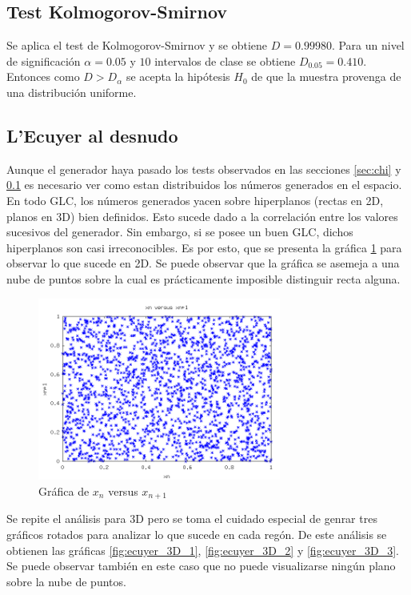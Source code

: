 \documentclass{sig-alternate}
\begin{document}
\subsection{Test Kolmogorov-Smirnov}
\label{sec:kolmogorov}
Se aplica el test de Kolmogorov-Smirnov y se obtiene $D=0.99980$.
Para un nivel de significaci\'on $\alpha=0.05$ y $10$ intervalos de clase
se obtiene $D_{0.05}=0.410$. Entonces como $D > D_{\alpha}$
se acepta la hip\'otesis $H_{0}$ de que la muestra
provenga de una distribuci\'on uniforme.

\subsection{L'Ecuyer al desnudo}
Aunque el generador haya pasado los tests observados en las secciones \ref{sec:chi} y \ref{sec:kolmogorov}
es necesario ver como estan distribuidos los n\'umeros generados en el espacio. En todo GLC,
los n\'umeros generados yacen sobre hiperplanos (rectas en 2D, planos en 3D) bien definidos. Esto
sucede dado a la correlaci\'on entre los valores sucesivos del generador.
Sin embargo, si se posee un buen GLC, dichos hiperplanos son casi irreconocibles. Es por esto,
que se presenta la gr\'afica \ref{fig:ecuyer_2D} para observar lo que sucede en 2D.
Se puede observar que la gr\'afica se asemeja a una nube de puntos sobre la cual es
pr\'acticamente imposible distinguir recta alguna. \\


\begin{figure}[ht]
\label{fig:ecuyer_2D}
\includegraphics[width=8cm]{ecuyer2D}
\caption{Gr\'afica de $x_{n}$ versus $x_{n+1}$}
\end{figure}

Se repite el an\'alisis para 3D pero se toma el cuidado especial de genrar tres gr\'aficos rotados
para analizar lo que sucede en cada reg\'on. De este an\'alisis se obtienen las gr\'aficas
\ref{fig:ecuyer_3D_1}, \ref{fig:ecuyer_3D_2} y \ref{fig:ecuyer_3D_3}. Se puede observar
tambi\'en en este caso que no puede visualizarse ning\'un plano sobre la nube de puntos. \\
\end{document}

